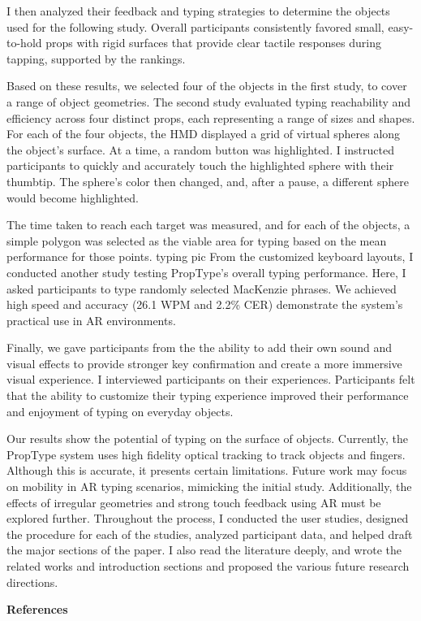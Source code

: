 \documentclass[12pt, letterpaper, twocolumn]{article}
\begin{document}
	I then analyzed their feedback and typing strategies to determine the objects used for the following study. Overall participants consistently favored small, easy-to-hold props with rigid surfaces that provide clear tactile responses during tapping, supported by the rankings. 
	
	Based on these results, we selected four of the objects in the first study, to cover a range of object geometries. The second study evaluated typing reachability and efficiency across four distinct props, each representing a range of sizes and shapes. For each of the four objects, the HMD displayed a grid of virtual spheres along the object's surface. At a time, a random button was highlighted. I instructed participants to quickly and accurately touch the highlighted sphere with their thumbtip. The sphere's color then changed, and, after a pause, a different sphere would become highlighted. 
	
	The time taken to reach each target was measured, and for each of the objects, a simple polygon was selected as the viable area for typing based on the mean performance for those points. typing pic From the customized keyboard layouts, I conducted another study testing PropType’s overall typing performance. Here, I asked participants to type randomly selected MacKenzie phrases. We achieved high speed and accuracy (26.1 WPM and 2.2\% CER) demonstrate the system’s practical use in AR environments.
	
	Finally, we gave participants from the  the ability to add their own sound and visual effects to provide stronger key confirmation and create a more immersive visual experience. I interviewed participants on their experiences. Participants felt that the ability to customize their typing experience improved their performance and enjoyment of typing on everyday objects. 
	
	Our results show the potential of typing on the surface of objects. Currently, the PropType system uses high fidelity optical tracking to track objects and fingers. Although this is accurate, it presents certain limitations. Future work may focus on mobility in AR typing scenarios, mimicking the initial study. Additionally, the effects of irregular geometries and strong touch feedback using AR must be explored further. Throughout the process, I conducted the user studies, designed the procedure for each of the studies, analyzed participant data, and helped draft the major sections of the paper. I also read the literature deeply, and wrote the related works and introduction sections and proposed the various future research directions.
	
	
	\noindent\textbf{References}
	\vspace{-0.125in}
	\printbibliography[heading=none]
	
\end{document}
